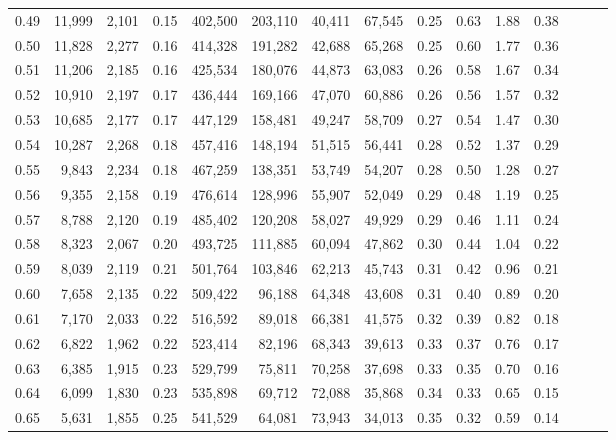 \begin{tabular}{rrrrrrrrrrrrrrr}
0.49 &  11,999 &  2,101 &  0.15 &  402,500 &  203,110 &   40,411 &   67,545 &  0.25 &  0.63 &  1.88 &      0.38 \\
0.50 &  11,828 &  2,277 &  0.16 &  414,328 &  191,282 &   42,688 &   65,268 &  0.25 &  0.60 &  1.77 &      0.36 \\
0.51 &  11,206 &  2,185 &  0.16 &  425,534 &  180,076 &   44,873 &   63,083 &  0.26 &  0.58 &  1.67 &      0.34 \\
0.52 &  10,910 &  2,197 &  0.17 &  436,444 &  169,166 &   47,070 &   60,886 &  0.26 &  0.56 &  1.57 &      0.32 \\
0.53 &  10,685 &  2,177 &  0.17 &  447,129 &  158,481 &   49,247 &   58,709 &  0.27 &  0.54 &  1.47 &      0.30 \\
0.54 &  10,287 &  2,268 &  0.18 &  457,416 &  148,194 &   51,515 &   56,441 &  0.28 &  0.52 &  1.37 &      0.29 \\
0.55 &   9,843 &  2,234 &  0.18 &  467,259 &  138,351 &   53,749 &   54,207 &  0.28 &  0.50 &  1.28 &      0.27 \\
0.56 &   9,355 &  2,158 &  0.19 &  476,614 &  128,996 &   55,907 &   52,049 &  0.29 &  0.48 &  1.19 &      0.25 \\
0.57 &   8,788 &  2,120 &  0.19 &  485,402 &  120,208 &   58,027 &   49,929 &  0.29 &  0.46 &  1.11 &      0.24 \\
0.58 &   8,323 &  2,067 &  0.20 &  493,725 &  111,885 &   60,094 &   47,862 &  0.30 &  0.44 &  1.04 &      0.22 \\
0.59 &   8,039 &  2,119 &  0.21 &  501,764 &  103,846 &   62,213 &   45,743 &  0.31 &  0.42 &  0.96 &      0.21 \\
0.60 &   7,658 &  2,135 &  0.22 &  509,422 &   96,188 &   64,348 &   43,608 &  0.31 &  0.40 &  0.89 &      0.20 \\
0.61 &   7,170 &  2,033 &  0.22 &  516,592 &   89,018 &   66,381 &   41,575 &  0.32 &  0.39 &  0.82 &      0.18 \\
0.62 &   6,822 &  1,962 &  0.22 &  523,414 &   82,196 &   68,343 &   39,613 &  0.33 &  0.37 &  0.76 &      0.17 \\
0.63 &   6,385 &  1,915 &  0.23 &  529,799 &   75,811 &   70,258 &   37,698 &  0.33 &  0.35 &  0.70 &      0.16 \\
0.64 &   6,099 &  1,830 &  0.23 &  535,898 &   69,712 &   72,088 &   35,868 &  0.34 &  0.33 &  0.65 &      0.15 \\
0.65 &   5,631 &  1,855 &  0.25 &  541,529 &   64,081 &   73,943 &   34,013 &  0.35 &  0.32 &  0.59 &      0.14 \\

\end{tabular}
